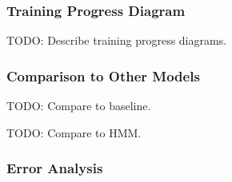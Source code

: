 \documentclass[11pt]{article}
\begin{document}
\subsubsection{Training Progress Diagram}

TODO: Describe training progress diagrams.

\subsubsection{Comparison to Other Models}

TODO: Compare to baseline.

TODO: Compare to HMM.

\subsubsection{Error Analysis}
\end{document}

